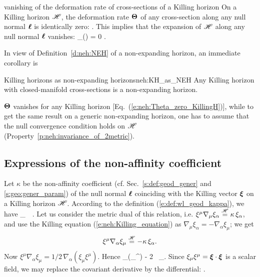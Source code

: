 \begin{tprop}{vanishing of the deformation rate of cross-sections of a Killing horizon}{}
On a Killing horizon $\mathscr{H}$,
the deformation rate $\bm{\Theta}$ of any cross-section along any null normal $\bm{\ell}$
is identically zero:
\be \label{e:neh:Theta_zero_KillingH}
   .
\ee
This implies that the expansion of $\mathscr{H}$ along any null normal $\bm{\ell}$ vanishes:
\be
    \theta_{(\wl)} = 0 .
\ee
\end{tprop}
In view of Definition~\ref{d:neh:NEH} of a non-expanding horizon,
an immediate corollary is
\begin{tprop}{Killing horizons as non-expanding horizons}{neh:KH_as_NEH}
Any Killing horizon with closed-manifold cross-sections is a non-expanding horizon.
\end{tprop}

\begin{remark}
$\bm{\Theta}$ vanishes for any Killing horizon [Eq.~(\ref{e:neh:Theta_zero_KillingH})], while to get the same result on a generic non-expanding horizon, one has to assume that the null convergence condition holds on $\mathscr{H}$
(Property~\ref{p:neh:invariance_of_2metric}).
\end{remark}

\subsection{Expressions of the non-affinity coefficient}

Let $\kappa$ be the non-affinity coefficient
(cf. Sec.~\ref{s:def:geod_gener} and \ref{s:geo:gener_param})
of the null normal $\bm{\ell}$ coinciding with the Killing vector $\bm{\xi}$
on a Killing horizon $\mathscr{H}$. According to the definition
(\ref{e:def:wl_geod_kappa}), we have
\be \label{e:neh:xi_nab_xi_kappa}
    \wnab_{\w{\xi}}\, \w{\xi} \equalH \kappa \, \w{\xi} .
\ee
Let us consider the metric dual of this relation, i.e.
$\xi^\mu \nabla_\mu \xi_\alpha \stackrel{\mathscr{H}}{=} \kappa \, \xi_\alpha$,
and use the Killing equation (\ref{e:neh:Killing_equation}) as
$\nabla_\mu \xi_\alpha = - \nabla_\alpha \xi_\mu$; we get
\[
    \xi^\mu \nabla_\alpha \xi_\mu \stackrel{\mathscr{H}}{=} - \kappa \, \xi_\alpha .
\]
Now $\xi^\mu \nabla_\alpha \xi_\mu = 1/2 \, \nabla_\alpha (\xi_\mu \xi^\mu)$.
Hence
\be
    \nabla_\alpha (\xi_\mu \xi^\mu) \equalH - 2 \kappa \, \xi_\alpha.
\ee
Since $\xi_\mu \xi^\mu = \bm{\xi}\cdot\bm{\xi}$ is a scalar field, we may
replace the covariant derivative by the differential:
\be \label{e:neh:dxi2_kappa}
    \encadre{ \dd (\w{\xi}\cdot\w{\xi}) \equalH - 2 \kappa \, \uu{\xi} } .
\ee

